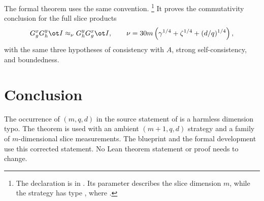 \documentclass{article}
\begin{document}
The formal theorem uses the same convention.%
\footnote{The declaration is
in . Its parameter
 describes the slice dimension $m$, while the strategy has
type , where .}
It proves the commutativity conclusion for the full slice products
\[
  G^x_g G^y_h \ot I \approx_\nu G^y_h G^x_g \ot I,
  \qquad
  \nu = 30m\left(\gamma^{1/4}+\zeta^{1/4}+(d/q)^{1/4}\right),
\]
with the same three hypotheses of consistency with $A$, strong
self-consistency, and boundedness.

\section{Conclusion}

The occurrence of $(m,q,d)$ in the source statement of
 is a harmless dimension typo. The theorem is used
with an ambient $(m+1,q,d)$ strategy and a family of $m$-dimensional slice
measurements. The blueprint and the formal development use this corrected
statement. No Lean theorem statement or proof needs to change.



\end{document}
